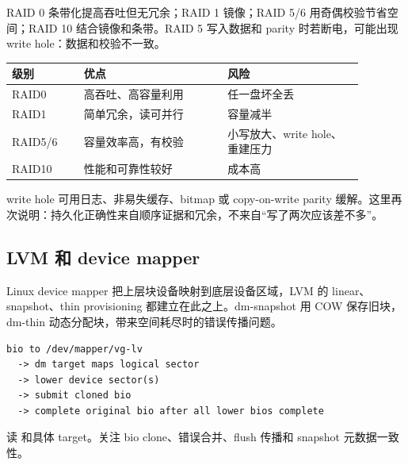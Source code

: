 RAID 0 条带化提高吞吐但无冗余；RAID 1 镜像；RAID 5/6 用奇偶校验节省空间；RAID 10 结合镜像和条带。RAID 5 写入数据和 parity 时若断电，可能出现 write hole：数据和校验不一致。

\begin{longtable}{|p{0.18\linewidth}|p{0.36\linewidth}|p{0.34\linewidth}|}
\toprule
级别 & 优点 & 风险 \\
\midrule
RAID0 & 高吞吐、高容量利用 & 任一盘坏全丢 \\\tablerowrule
RAID1 & 简单冗余，读可并行 & 容量减半 \\\tablerowrule
RAID5/6 & 容量效率高，有校验 & 小写放大、write hole、重建压力 \\\tablerowrule
RAID10 & 性能和可靠性较好 & 成本高 \\
\bottomrule
\end{longtable}

write hole 可用日志、非易失缓存、bitmap 或 copy-on-write parity 缓解。这里再次说明：持久化正确性来自顺序证据和冗余，不来自“写了两次应该差不多”。

\subsection{LVM 和 device mapper}

Linux device mapper 把上层块设备映射到底层设备区域，LVM 的 linear、snapshot、thin provisioning 都建立在此之上。dm-snapshot 用 COW 保存旧块，dm-thin 动态分配块，带来空间耗尽时的错误传播问题。

\begin{lstlisting}
bio to /dev/mapper/vg-lv
  -> dm target maps logical sector
  -> lower device sector(s)
  -> submit cloned bio
  -> complete original bio after all lower bios complete
\end{lstlisting}

读  和具体 target。关注 bio clone、错误合并、flush 传播和 snapshot 元数据一致性。
